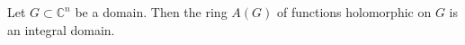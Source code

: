 Let $G \subset \mathbb{C}^n$ be a domain. Then the ring $A(G)$ of functions holomorphic on $G$ is an integral domain.
